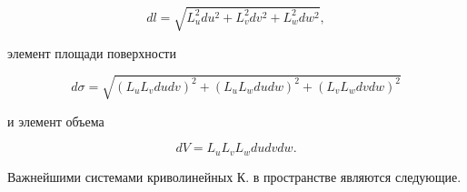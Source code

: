 \documentclass[10pt]{article}
\begin{document}
\[

d l=\sqrt{L_{u}^{2} d u^{2}+L_{v}^{2} d v^{2}+L_{w}^{2} d w^{2}},

\]



элемент площади поверхности



\[

d \sigma=\sqrt{\left(L_{u} L_{v} d u d v\right)^{2}+\left(L_{u} L_{w} d u d w\right)^{2}+\left(L_{v} L_{w} d v d w\right)^{2}}

\]



и элемент объема



\[

d V=L_{u} L_{v} L_{w} d u d v d w .

\]



Важнейшими системами криволинейных К. в пространстве являются следующие.
\end{document}
